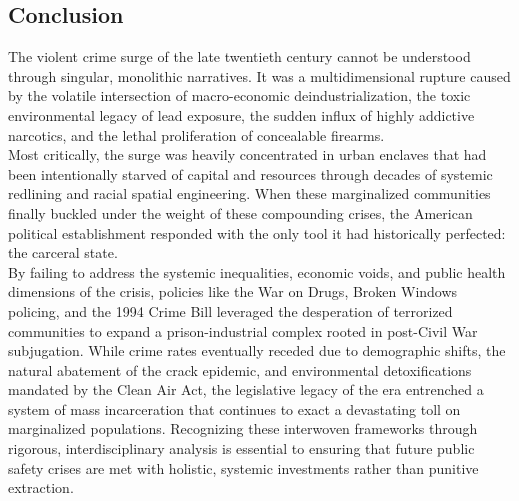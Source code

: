\documentclass[
]{article}
\newcounter{none} %
\begin{document}
\subsection{\texorpdfstring{\textbf{Conclusion}}{Conclusion}}\label{conclusion}

The violent crime surge of the late twentieth century cannot be
understood through singular, monolithic narratives. It was a
multidimensional rupture caused by the volatile intersection of
macro-economic deindustrialization, the toxic environmental legacy of
lead exposure, the sudden influx of highly addictive narcotics, and the
lethal proliferation of concealable firearms.\\
Most critically, the surge was heavily concentrated in urban enclaves
that had been intentionally starved of capital and resources through
decades of systemic redlining and racial spatial engineering. When these
marginalized communities finally buckled under the weight of these
compounding crises, the American political establishment responded with
the only tool it had historically perfected: the carceral state.\\
By failing to address the systemic inequalities, economic voids, and
public health dimensions of the crisis, policies like the War on Drugs,
Broken Windows policing, and the 1994 Crime Bill leveraged the
desperation of terrorized communities to expand a prison-industrial
complex rooted in post-Civil War subjugation. While crime rates
eventually receded due to demographic shifts, the natural abatement of
the crack epidemic, and environmental detoxifications mandated by the
Clean Air Act, the legislative legacy of the era entrenched a system of
mass incarceration that continues to exact a devastating toll on
marginalized populations. Recognizing these interwoven frameworks
through rigorous, interdisciplinary analysis is essential to ensuring
that future public safety crises are met with holistic, systemic
investments rather than punitive extraction.

\nocite{*}
\printbibliography[title={Works cited},sorting=none]
\label{works-cited}
\end{document}
